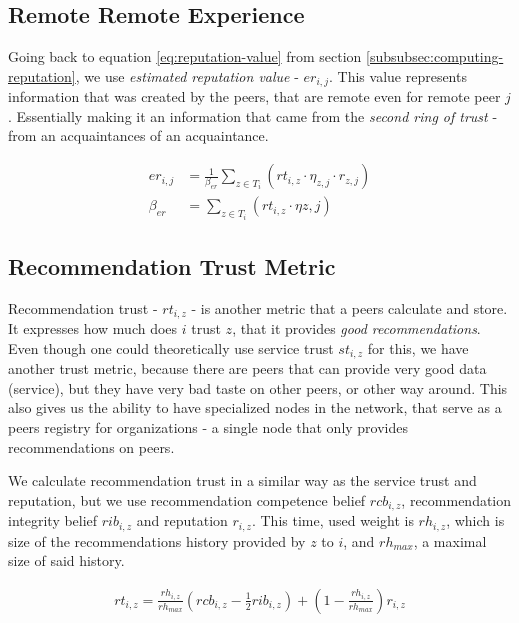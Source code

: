 \subsection{Remote Remote Experience}
Going back to equation \ref{eq:reputation-value} from section \ref{subsubsec:computing-reputation}, we use \textit{estimated reputation value} - $er_{i,j}$.
This value represents information that was created by the peers, that are remote even for remote peer $j$. 
Essentially making it an information that came from the \textit{second ring of trust} - from an acquaintances of an acquaintance.

\begin{equation}
\label{eq:estimated-reputation}
\begin{split}
    er_{i,j} &= \frac{1}{\beta_{er}} \sum_{z \in T_{i}} \left(rt_{i, z} \cdot \eta_{z, j} \cdot r_{z, j}\right) \\
    \beta_{er} &= \sum_{z \in T_{i}} \left(rt_{i, z} \cdot \eta{z, j}\right)
\end{split}
\end{equation}

\subsection{Recommendation Trust Metric}
\label{subsec:recommendation-trust-metric}
Recommendation trust - $rt_{i,z}$ - is another metric that a peers calculate and store. It expresses how much does $i$ trust $z$, that it provides \textit{good recommendations}.
Even though one could theoretically use service trust $st_{i, z}$ for this,
we have another trust metric, because there are peers that can provide very good data (service), but they have very bad taste on other peers, or other way around.
This also gives us the ability to have specialized nodes in the network, that serve as a peers registry for organizations - a single node that only provides recommendations on peers.

We calculate recommendation trust in a similar way as the service trust and reputation, but we use recommendation competence belief $rcb_{i, z}$, recommendation integrity belief $rib_{i,z}$ and reputation $r_{i, z}$.
This time, used weight is $rh_{i,z}$, which is size of the recommendations history provided by $z$ to $i$, and $rh_{max}$, a maximal size of said history.

\begin{equation}
\label{eq:recommendation-trust}
\begin{split}
    rt_{i, z} = \frac{rh_{i,z}}{rh_{max}} \left(rcb_{i,z} - \frac{1}{2} rib_{i, z} \right) + \left(1 - \frac{rh_{i,z}}{rh_{max}} \right) r_{i,z}
\end{split}
\end{equation}

